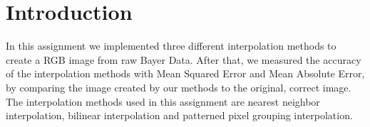\section{Introduction}
In this assignment we implemented three different interpolation methods to create a RGB image from raw Bayer Data.
After that, we measured the accuracy of the interpolation methods with Mean Squared Error and Mean Absolute Error, by comparing the image created by our methods to the original, correct image. The interpolation methods used in this assignment are nearest neighbor interpolation, bilinear interpolation and patterned pixel grouping interpolation.